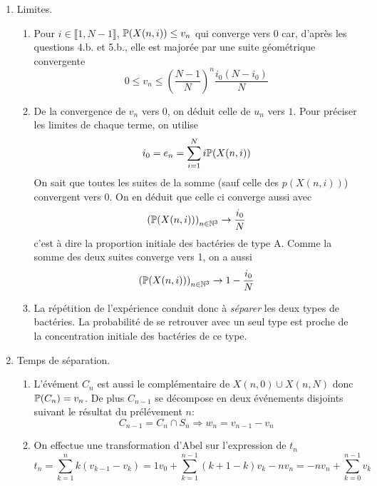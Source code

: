 \begin{enumerate}
  \item Limites.
\begin{enumerate}
  \item Pour $i\in\llbracket 1, N-1\rrbracket$, $\mathbb{P}(X(n,i))\leq v_n$ qui converge vers $0$ car, d'après les questions 4.b. et 5.b., elle est majorée par une suite géométrique convergente
\begin{displaymath}
  0\leq v_n \leq \left( \frac{N-1}{N}\right) ^{n}\frac{i_0 (N-i_0)}{N}
\end{displaymath}
 
  \item De la convergence de $v_n$ vers $0$, on déduit celle de $u_n$ vers $1$. Pour préciser les limites de chaque terme, on utilise 
\begin{displaymath}
  i_0 = e_n = \sum_{i=1}^N i \mathbb{P}(X(n,i))
\end{displaymath}
On sait que toutes les suites de la somme (sauf celle des $p(X(n,i))$) convergent vers $0$. On en déduit que celle ci converge aussi avec
\begin{displaymath}
  \left( \mathbb{P}(X(n,i))\right) _{n\in \mathbb{N}^3} \rightarrow \frac{i_0}{N}
\end{displaymath}
c'est à dire la proportion initiale des bactéries de type A. Comme la somme des deux suites converge vers 1, on a aussi
\begin{displaymath}
  \left( \mathbb{P}(X(n,i))\right) _{n\in \mathbb{N}^3} \rightarrow 1-\frac{i_0}{N}
\end{displaymath}

  \item La répétition de l'expérience conduit donc à \emph{séparer} les deux types de bactéries. La probabilité de se retrouver avec un seul type est proche de la concentration initiale des bactéries de ce type.
\end{enumerate}

  \item Temps de séparation.
\begin{enumerate}
  \item L'évément $C_{n}$ est aussi le complémentaire de $X(n,0)\cup X(n,N)$ donc $\mathbb{P}(C_n)=v_n$. De plus $C_{n-1}$ se décompose en deux événements disjoints suivant le résultat du prélévement $n$:
\begin{displaymath}
C_{n-1} = C_{n} \cap S_n  \Rightarrow w_n = v_{n-1} - v_{n}
\end{displaymath}

  \item On effectue une transformation d'Abel sur l'expression de $t_n$
\begin{displaymath}
  t_n = \sum_{k=1}^nk(v_{k-1}-v_k)
= 1v_0 + \sum_{k=1}^{n-1}(k+1-k)v_k - nv_n
= - nv_n + \sum_{k=0}^{n-1}v_k 
\end{displaymath}


\end{enumerate}
\end{enumerate}
